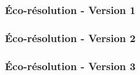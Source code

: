 
\begin{frame}
    \frametitle{Éco-résolution - Version 1}
\end{frame}

\begin{frame}
    \frametitle{Éco-résolution - Version 2}
\end{frame}


\begin{frame}
    \frametitle{Éco-résolution - Version 3}
\end{frame}

